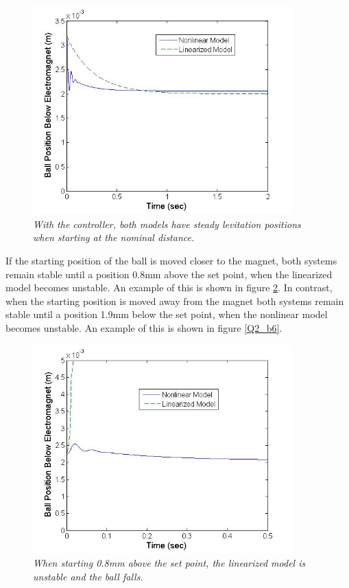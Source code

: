 \documentclass{article}
\theoremstyle{plain}
\theoremstyle{definition}
\theoremstyle{remark}
\begin{document}
\begin{figure}[h!]
\begin{center}
\includegraphics[width = 10cm]{Part2bNoDisturbance}
\caption{\emph{With the controller, both models have steady levitation positions when starting at the nominal distance.}}
\label{Q2_b4}
\end{center}
\end{figure}

If the starting position of the ball is moved closer to the magnet, both systems remain stable until a position 0.8mm above the set point, when the linearized model becomes unstable. An example of this is shown in figure \ref{Q2_b5}. In contrast, when the starting position is moved away from the magnet both systems remain stable until a position 1.9mm below the set point, when the nonlinear model becomes unstable. An example of this is shown in figure \ref{Q2_b6}.\\

\begin{figure}[h!]
\begin{center}
\includegraphics[width = 10cm]{Part2bCloseDisturbance}
\caption{\emph{When starting 0.8mm above the set point, the linearized model is unstable and the ball falls.}}
\label{Q2_b5}
\end{center}
\end{figure}
\end{document}
